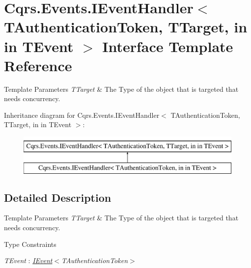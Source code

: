 \hypertarget{interfaceCqrs_1_1Events_1_1IEventHandler}{}\section{Cqrs.\+Events.\+I\+Event\+Handler$<$ T\+Authentication\+Token, T\+Target, in in T\+Event $>$ Interface Template Reference}
\label{interfaceCqrs_1_1Events_1_1IEventHandler}



\begin{DoxyTemplParams}{Template Parameters}
{\em T\+Target} & The Type of the object that is targeted that needs concurrency.\\
\hline
\end{DoxyTemplParams}
 


Inheritance diagram for Cqrs.\+Events.\+I\+Event\+Handler$<$ T\+Authentication\+Token, T\+Target, in in T\+Event $>$\+:\begin{figure}[H]
\begin{center}
\leavevmode
\includegraphics[height=2.000000cm]{interfaceCqrs_1_1Events_1_1IEventHandler}
\end{center}
\end{figure}


\subsection{Detailed Description}

\begin{DoxyTemplParams}{Template Parameters}
{\em T\+Target} & The Type of the object that is targeted that needs concurrency.\\
\hline
\end{DoxyTemplParams}
\begin{Desc}
\item[Type Constraints]\begin{description}
\item[{\em T\+Event} : {\em \hyperlink{interfaceCqrs_1_1Events_1_1IEvent}{I\+Event}$<$T\+Authentication\+Token$>$}]\end{description}
\end{Desc}
